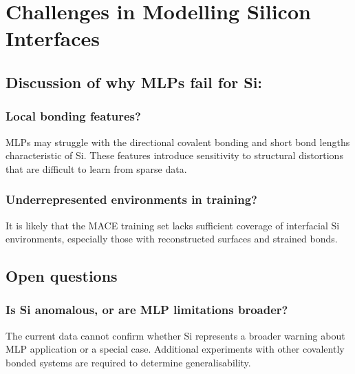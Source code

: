 \section{Challenges in Modelling Silicon Interfaces} \label{section:challenges_in_modelling_silicon_interfaces}

\subsection{Discussion of why MLPs fail for Si:}

\subsubsection{Local bonding features?}

MLPs may struggle with the directional covalent bonding and short bond lengths characteristic of Si. These features introduce sensitivity to structural distortions that are difficult to learn from sparse data.

\subsubsection{Underrepresented environments in training?}

It is likely that the MACE training set lacks sufficient coverage of interfacial Si environments, especially those with reconstructed surfaces and strained bonds.

\subsection{Open questions}

\subsubsection{Is Si anomalous, or are MLP limitations broader?}

The current data cannot confirm whether Si represents a broader warning about MLP application or a special case. Additional experiments with other covalently bonded systems are required to determine generalisability.